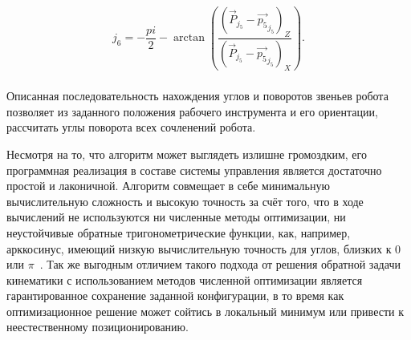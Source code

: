 \begin{gather*}
    j_6 = -\dfrac{pi}{2} - \arctan \left( \dfrac
    {\left( \overrightarrow{P}_{j_5} - \overrightarrow{p_5}_{j_5} \right)_Z}
    {\left( \overrightarrow{P}_{j_5} - \overrightarrow{p_5}_{j_5} \right)_X} \right).
\end{gather*} \\

Описанная последовательность нахождения углов и поворотов звеньев робота позволяет из заданного положения рабочего инструмента и его ориентации, рассчитать углы поворота всех сочленений робота.

Несмотря на то, что алгоритм может выглядеть излишне громоздким, его программная реализация в составе системы управления является достаточно простой и лаконичной.
Алгоритм совмещает в себе минимальную вычислительную сложность и высокую точность за счёт того, что в ходе вычислений не используются ни численные методы оптимизации, ни неустойчивые обратные тригонометрические функции, как, например, арккосинус, имеющий низкую вычислительную точность для углов, близких к $0$ или $\pi$~\cite{bib:Fu_1987}.
Так же выгодным отличием такого подхода от решения обратной задачи кинематики с использованием методов численной оптимизации является гарантированное сохранение заданной конфигурации, в то время как оптимизационное решение может сойтись в локальный минимум или привести к неестественному позиционированию.
